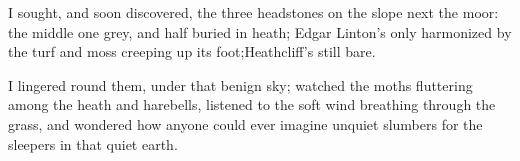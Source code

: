\par I sought, and soon discovered, the three headstones on the slope next the moor: the middle one grey, and half buried in heath; Edgar Linton's only harmonized by the turf and moss creeping up its foot;Heathcliff's still bare.
\par I lingered round them, under that benign sky; watched the moths fluttering among the heath and harebells, listened to the soft wind breathing through the grass, and wondered how anyone could ever imagine unquiet slumbers for the sleepers in that quiet earth.













